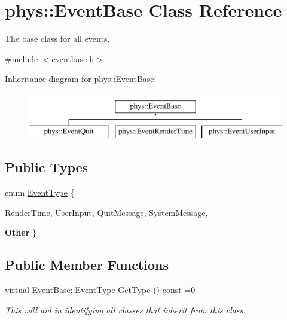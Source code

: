 \hypertarget{classphys_1_1EventBase}{
\section{phys::EventBase Class Reference}
\label{dd/d80/classphys_1_1EventBase}
}


The base class for all events.  




{\ttfamily \#include $<$eventbase.h$>$}

Inheritance diagram for phys::EventBase:\begin{figure}[H]
\begin{center}
\leavevmode
\includegraphics[height=2cm]{dd/d80/classphys_1_1EventBase}
\end{center}
\end{figure}
\subsection*{Public Types}
\begin{DoxyCompactItemize}
\item 
enum \hyperlink{classphys_1_1EventBase_a5e6a8564e127f654123f0bf6a2751923}{EventType} \{ \par
\hyperlink{classphys_1_1EventBase_a5e6a8564e127f654123f0bf6a2751923acdfa47d279e8a1c460d557d14b85c7a5}{RenderTime}, 
\hyperlink{classphys_1_1EventBase_a5e6a8564e127f654123f0bf6a2751923a320cc0817dc2c2201501b12c50c89bef}{UserInput}, 
\hyperlink{classphys_1_1EventBase_a5e6a8564e127f654123f0bf6a2751923a84742ff55e9abdde8f5e0578d30f73a9}{QuitMessage}, 
\hyperlink{classphys_1_1EventBase_a5e6a8564e127f654123f0bf6a2751923a18594400c60af959158e9f5cc2cd5d08}{SystemMessage}, 
\par
{\bfseries Other}
 \}
\end{DoxyCompactItemize}
\subsection*{Public Member Functions}
\begin{DoxyCompactItemize}
\item 
virtual \hyperlink{classphys_1_1EventBase_a5e6a8564e127f654123f0bf6a2751923}{EventBase::EventType} \hyperlink{classphys_1_1EventBase_a1b3d29b6ecf30f18cc3e1825a515c508}{GetType} () const =0
\begin{DoxyCompactList}\small\item\em This will aid in identifying all classes that inherit from this class. \item\end{DoxyCompactList}\end{DoxyCompactItemize}


